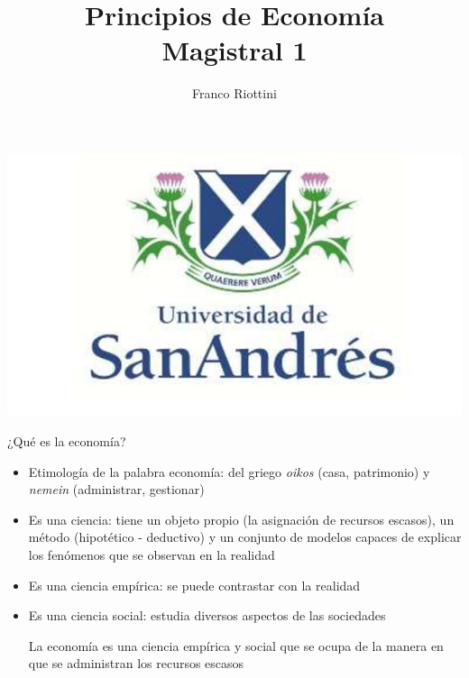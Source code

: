 \documentclass{beamer}
\title[Principios de Economía]{Principios de Economía \vspace{4mm} \\
Magistral 1}
\date{}
\author[Riottini]{Franco Riottini}
\institute[]{Universidad de San Andrés}
\begin{document}
\begin{frame}
\titlepage
\centering
\includegraphics[scale=0.2]{../Figures/logoUDESA.jpg} 
\end{frame}



\begin{frame}{¿Qué es la economía?}
    \begin{itemize}
        \item Etimología de la palabra economía: del griego \textit{oikos} (casa, patrimonio) y \textit{nemein} (administrar, gestionar) \vspace{2mm}
        \item Es una ciencia: tiene un objeto propio (la asignación de recursos escasos), un método (hipotético - deductivo) y un conjunto de modelos capaces de explicar los fenómenos que se observan en la realidad
        \item Es una ciencia empírica: se puede contrastar con la realidad 
        \item Es una ciencia social: estudia diversos aspectos de las sociedades
        \vspace{2mm}
        \begin{center}
            \begin{boxA}
            La economía es una ciencia empírica y social que se ocupa de la manera en que se administran los recursos escasos
            \end{boxA}
        \end{center}
    \end{itemize}
\end{frame}
\end{document}
